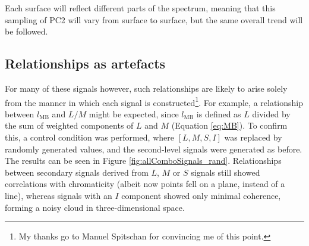 
Each surface will reflect different parts of the spectrum, meaning that this sampling of \gls{PC2} will vary from surface to surface, but the same overall trend will be followed.


\subsection{Relationships as artefacts}

For many of these signals however, such relationships are likely to arise solely from the manner in which each signal is constructed\footnote{My thanks go to Manuel Spitschan for convincing me of this point.}. For example, a relationship between $l_{\text{MB}}$ and $L/M$ might be expected, since $l_{\text{MB}}$ is defined as $L$ divided by the sum of weighted components of $L$ and $M$ (Equation \ref{eq:MB}). To confirm this, a control condition was performed, where $[L,M,S,I]$ was replaced by randomly generated values, and the second-level signals were generated as before. The results can be seen in Figure \ref{fig:allComboSignals_rand}. Relationships between secondary signals derived from $L$, $M$ or $S$ signals still showed correlations with chromaticity (albeit now points fell on a plane, instead of a line), whereas signals with an $I$ component showed only minimal coherence, forming a noisy cloud in three-dimensional space. 

